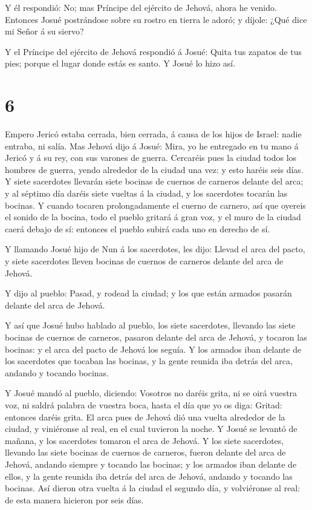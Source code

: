  Y él respondió: No; mas Príncipe del ejército de Jehová,
ahora he venido. Entonces Josué postrándose sobre su rostro en tierra le
adoró; y díjole: ¿Qué dice mi Señor á su siervo?

 Y el Príncipe del ejército de Jehová respondió á Josué:
Quita tus zapatos de tus pies; porque el lugar donde estás es santo. Y
Josué lo hizo así.

\hypertarget{section-5}{%
\section{6}\label{section-5}}

 Empero Jericó estaba cerrada, bien cerrada, á causa de los
hijos de Israel: nadie entraba, ni salía.  Mas Jehová dijo á
Josué: Mira, yo he entregado en tu mano á Jericó y á su rey, con sus
varones de guerra.  Cercaréis pues la ciudad todos los
hombres de guerra, yendo alrededor de la ciudad una vez: y esto haréis
seis días.  Y siete sacerdotes llevarán siete bocinas de
cuernos de carneros delante del arca; y al séptimo día daréis siete
vueltas á la ciudad, y los sacerdotes tocarán las bocinas. 
Y cuando tocaren prolongadamente el cuerno de carnero, así que oyereis
el sonido de la bocina, todo el pueblo gritará á gran voz, y el muro de
la ciudad caerá debajo de sí: entonces el pueblo subirá cada uno en
derecho de sí.

 Y llamando Josué hijo de Nun á los sacerdotes, les dijo:
Llevad el arca del pacto, y siete sacerdotes lleven bocinas de cuernos
de carneros delante del arca de Jehová.

 Y dijo al pueblo: Pasad, y rodead la ciudad; y los que
están armados pasarán delante del arca de Jehová.

 Y así que Josué hubo hablado al pueblo, los siete
sacerdotes, llevando las siete bocinas de cuernos de carneros, pasaron
delante del arca de Jehová, y tocaron las bocinas: y el arca del pacto
de Jehová los seguía.  Y los armados iban delante de los
sacerdotes que tocaban las bocinas, y la gente reunida iba detrás del
arca, andando y tocando bocinas.

 Y Josué mandó al pueblo, diciendo: Vosotros no daréis
grita, ni se oirá vuestra voz, ni saldrá palabra de vuestra boca, hasta
el día que yo os diga: Gritad: entonces daréis grita.  El
arca pues de Jehová dió una vuelta alrededor de la ciudad, y viniéronse
al real, en el cual tuvieron la noche.  Y Josué se levantó
de mañana, y los sacerdotes tomaron el arca de Jehová.  Y
los siete sacerdotes, llevando las siete bocinas de cuernos de carneros,
fueron delante del arca de Jehová, andando siempre y tocando las
bocinas; y los armados iban delante de ellos, y la gente reunida iba
detrás del arca de Jehová, andando y tocando las bocinas. 
Así dieron otra vuelta á la ciudad el segundo día, y volviéronse al
real: de esta manera hicieron por seis días.

